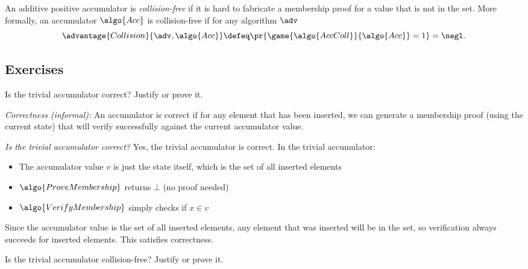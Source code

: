 \begin{definition}
    An additive positive accumulator is \emph{collision-free} if it is hard to fabricate a membership proof for a value that is not in the set.
    More formally, an accumulator $\algo{Acc}$ is collision-free if for any \ppt algorithm $\adv$
    \[
      \advantage{Collision}{\adv, \algo{Acc}} \defeq \pr{\game{\algo{AccColl}}{\algo{Acc}} = 1} = \negl.
    \]
\end{definition}

\subsection{Exercises}

\begin{exercise}
  Is the trivial accumulator correct?
  Justify or prove it.
\end{exercise}

\ifsolutions
\begin{mysolution}
  \emph{Correctness (informal):} An accumulator is correct if for any element that has been inserted, we can generate a membership proof (using the current state) that will verify successfully against the current accumulator value.
  
  \emph{Is the trivial accumulator correct?} Yes, the trivial accumulator is correct.
  In the trivial accumulator:
  \begin{itemize}
    \item The accumulator value $v$ is just the state itself, which is the set of all inserted elements
    \item $\algo{ProveMembership}$ returns $\bot$ (no proof needed)
    \item $\algo{VerifyMembership}$ simply checks if $x \in v$
  \end{itemize}
  
  Since the accumulator value is the set of all inserted elements, any element that was inserted will be in the set, so verification always succeeds for inserted elements.
  This satisfies correctness.
\end{mysolution}
\fi

\begin{exercise}
  Is the trivial accumulator collision-free?
  Justify or prove it.
\end{exercise}

